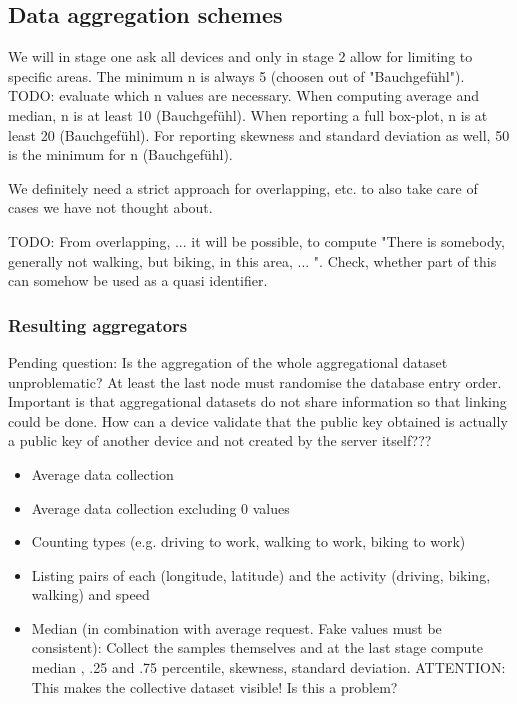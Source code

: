 \subsection{Data aggregation schemes}
We will in stage one ask all devices and only in stage 2 allow for limiting to specific areas. The minimum n is always 5 (choosen out of "Bauchgefühl").
TODO: evaluate which n values are necessary.
When computing average and median, n is at least 10 (Bauchgefühl).
When reporting a full box-plot, n is at least 20 (Bauchgefühl). 
For reporting skewness and standard deviation as well, 50 is the minimum for n (Bauchgefühl).

We definitely need a strict approach for overlapping, etc. to also take care of cases we have not thought about.

TODO: From overlapping, ... it will be possible, to compute "There is somebody, generally not walking, but biking, in this area, ... ". Check, whether part of this can somehow be used as a quasi identifier.
\subsubsection{Resulting aggregators}
Pending question: Is the aggregation of the whole aggregational dataset unproblematic? At least the last node must randomise the database entry order.
Important is that aggregational datasets do not share information so that linking could be done.
How can a device validate that the public key obtained is actually a public key of another device and not created by the server itself???
\begin{itemize}
	\item Average data collection
	\item Average data collection excluding 0 values
	\item Counting types (e.g. driving to work, walking to work, biking to work)
	\item Listing pairs of each (longitude, latitude) and the activity (driving, biking, walking) and speed
	\item Median (in combination with average request. Fake values must be consistent): Collect the samples themselves and at the last stage compute median , .25 and .75 percentile, skewness, standard deviation. ATTENTION: This makes the collective dataset visible! Is this a problem?
\end{itemize}

